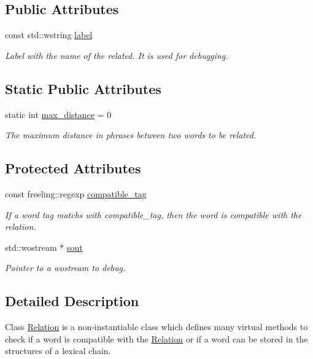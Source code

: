 \subsection*{Public Attributes}
\begin{DoxyCompactItemize}
\item 
const std\+::wstring \hyperlink{classRelation_a4885622334809b177f87b9034d9218fe}{label}
\begin{DoxyCompactList}\small\item\em Label with the name of the related. It is used for debugging. \end{DoxyCompactList}\end{DoxyCompactItemize}
\subsection*{Static Public Attributes}
\begin{DoxyCompactItemize}
\item 
static int \hyperlink{classRelation_a634818cf4618e3862961d457e8ba0448}{max\+\_\+distance} = 0
\begin{DoxyCompactList}\small\item\em The maximum distance in phrases between two words to be related. \end{DoxyCompactList}\end{DoxyCompactItemize}
\subsection*{Protected Attributes}
\begin{DoxyCompactItemize}
\item 
const freeling\+::regexp \hyperlink{classRelation_a3c44dc364bd5530017a4828fee9a14bf}{compatible\+\_\+tag}
\begin{DoxyCompactList}\small\item\em If a word tag matchs with compatible\+\_\+tag, then the word is compatible with the relation. \end{DoxyCompactList}\item 
std\+::wostream $\ast$ \hyperlink{classRelation_a44deec0ee05d803ea23e14520fd57a75}{sout}
\begin{DoxyCompactList}\small\item\em Pointer to a wostream to debug. \end{DoxyCompactList}\end{DoxyCompactItemize}


\subsection{Detailed Description}
Class \hyperlink{classRelation}{Relation} is a non-\/instantiable class which defines many virtual methods to check if a word is compatible with the \hyperlink{classRelation}{Relation} or if a word can be stored in the structures of a lexical chain. 

